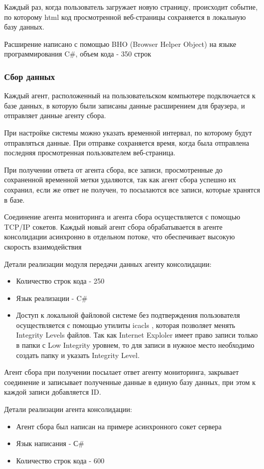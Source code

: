 \documentclass[russian, utf8, emptystyle]{eskdtext}
\begin{document}
Каждый раз, когда пользователь загружает новую страницу, происходит событие, по которому html код просмотренной веб-страницы сохраняется в локальную базу данных.

Расширение написано с помощью BHO (Browser Helper Object) на языке программирования C\#, объем кода - 350 строк
\subsubsection{Сбор данных}

Каждый агент, расположенный на пользовательском компьютере подключается к базе данных, в которую были записаны данные расширением для браузера, и отправляет данные агенту сбора.

При настройке системы можно указать временной интервал, по которому будут отправляться данные. При отправке сохраняется время, когда была отправлена последняя просмотренная пользователем веб-страница.

При получении ответа от агента сбора, все записи, просмотренные до сохраненной временной метки удаляются, так как агент сбора успешно их сохранил, если же ответ не получен, то посылаются все записи, которые хранятся в базе.

Соединение агента мониторинга и агента сбора осуществляется с помощью TCP/IP сокетов. Каждый новый агент сбора обрабатывается в агенте консолидации асинхронно в отдельном потоке, что обеспечивает высокую скорость взаимодействия

Детали реализации модуля передачи данных агенту консолидации:
\begin{itemize}
	\item Количество строк кода - 250
	\item Язык реализации - C\#
	\item Доступ к локальной файловой системе без подтверждения пользователя осуществляется с помощью утилиты icacls \cite{icacls}, которая позволяет менять Integrity Levels \cite{icacls} файлов. Так как Internet Exploler имеет право записи только в папки с Low Integrity уровнем, то для записи в нужное место необходимо создать папку и указать Integrity Level. 
\end{itemize}

Агент сбора при получении посылает ответ агенту мониторинга, закрывает соединение и записывает полученные данные в единую базу данных, при этом к каждой записи добавляется ID.

Детали реализации агента консолидации:
\begin{itemize}
	\item Агент сбора был написан на примере асинхронного сокет сервера \cite{msdn}
	\item Язык написания - С\#
	\item Количество строк кода - 600
\end{itemize}
\end{document}
